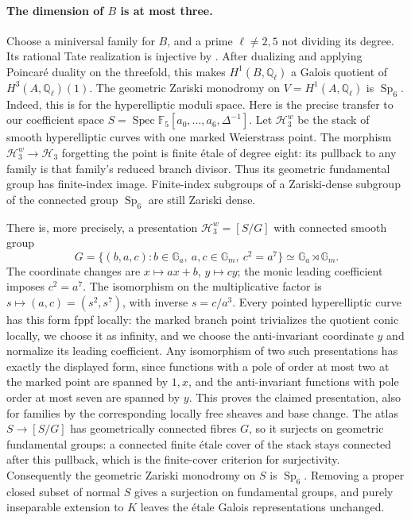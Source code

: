 \paragraph{The dimension of $B$ is at most three.}
Choose a miniversal family for $B$, and a prime $\ell\ne2,5$
not dividing its degree.  Its rational Tate realization is
injective by \cite[Proposition 8.2, p.~31]{DGJ_ACMVFunctor}.
After dualizing and applying Poincaré duality on the threefold,
this makes $H^1(B,\mathbb Q_\ell)$ a Galois quotient of
$H^3(A,\mathbb Q_\ell)(1)$.
The geometric Zariski monodromy on $V=H^1(A,\mathbb Q_\ell)$ is
$\operatorname{Sp}_6$.  Indeed, this is
\cite[Theorem 3.4 and Corollary 3.5, pp.~13--14]{DGJ_AchterPries2006}
for the hyperelliptic moduli space.  Here is the precise transfer to our coefficient space
$S=\operatorname{Spec}\mathbb F_5[a_0,\ldots,a_6,\Delta^{-1}]$.
Let $\mathcal H_3^w$ be the stack of smooth hyperelliptic
curves with one marked Weierstrass point.  The morphism
$\mathcal H_3^w\to\mathcal H_3$ forgetting the point is finite
étale of degree eight: its pullback to any family is that
family's reduced branch divisor.  Thus its geometric fundamental
group has finite-index image.  Finite-index subgroups of a
Zariski-dense subgroup of the connected group
$\operatorname{Sp}_6$ are still Zariski dense.

There is, more precisely, a presentation
$\mathcal H_3^w=[S/G]$ with connected smooth group
\[
 G=\{(b,a,c):b\in\mathbb G_a,\ a,c\in\mathbb G_m,
                    \ c^2=a^7\}
       \simeq\mathbb G_a\rtimes\mathbb G_m.
\]
The coordinate changes are $x\mapsto ax+b$, $y\mapsto cy$;
the monic leading coefficient imposes $c^2=a^7$.
The isomorphism on the multiplicative factor is
$s\mapsto(a,c)=(s^2,s^7)$, with inverse $s=c/a^3$.
Every pointed hyperelliptic curve has this form fppf locally:
the marked branch point trivializes the quotient conic locally,
we choose it as infinity, and we choose the anti-invariant
coordinate $y$ and normalize its leading coefficient.  Any
isomorphism of two such presentations has exactly the displayed
form, since functions with a pole of order at most two at the
marked point are spanned by $1,x$, and the anti-invariant
functions with pole order at most seven are spanned by $y$.
This proves the claimed presentation, also for families by the
corresponding locally free sheaves and base change.
The atlas $S\to[S/G]$ has geometrically connected fibres $G$,
so it surjects on geometric fundamental groups: a connected
finite étale cover of the stack stays connected after this
pullback, which is the finite-cover criterion for surjectivity.
Consequently the geometric Zariski monodromy on $S$ is
$\operatorname{Sp}_6$.  Removing a proper closed subset of
normal $S$ gives a surjection on fundamental groups, and
purely inseparable extension to $K$ leaves the étale Galois
representations unchanged.

